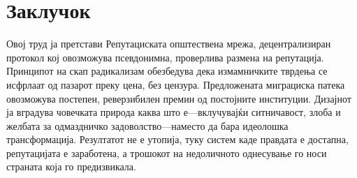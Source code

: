 \documentclass[11pt,a4paper,twocolumn]{article}
\begin{document}
\section{Заклучок}

Овој труд ја претстави Репутациската општествена мрежа, децентрализиран протокол кој овозможува псевдонимна, проверлива размена на репутација. Принципот на скап радикализам обезбедува дека измамничките тврдења се исфрлаат од пазарот преку цена, без цензура. Предложената миграциска патека овозможува постепен, реверзибилен премин од постојните институции. Дизајнот ја вградува човечката природа каква што е---вклучувајќи ситничавост, злоба и желбата за одмаздничко задоволство---наместо да бара идеолошка трансформација. Резултатот не е утопија, туку систем каде правдата е достапна, репутацијата е заработена, а трошокот на недоличното однесување го носи страната која го предизвикала.


\end{document}
